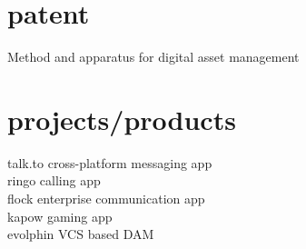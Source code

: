 \begin{minipage}[t]{0.33\textwidth}
\sectionspace %


\section{patent}
Method and apparatus for digital asset management \href{https://patents.google.com/patent/US8868506B1/en?inventor=Kunjan+Aggarwal}{\faChain}
\sectionspace %


\section{projects/products}
talk.to cross-platform messaging app \\
ringo calling app \href{https://www.ringo.co/}{\faChain}\\
flock enterprise communication app \href{https://flock.com}{\faChain} \\
kapow gaming app \\
evolphin VCS based DAM \href{https://evolphin.com/}{\faChain} \\

\end{minipage} %
\hfill
%
%
